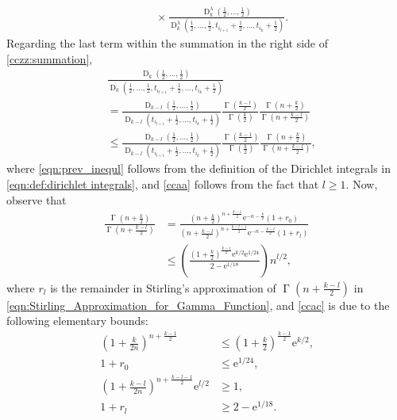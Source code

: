 \documentclass[journal, 10pt]{IEEEtran}
\newcommand{\rme}{\mathrm{e}}
\theoremstyle{plain}
\theoremstyle{plain}
\theoremstyle{plain}
\theoremstyle{plain}
\newcommand{\opD}{\operatorname{D}}
\newcommand{\opGamma}{\operatorname{\Gamma}}
\begin{document}
\begin{appendices}
\begin{IEEEproof}
\begin{align}
&\qquad \times \frac{\opD^{\lambda}_k (\frac12, \ldots, \frac12)}{{\opD^{\lambda}_k (\frac12, \hdots, \frac12, t_{i_{l+1}}+\frac12, \ldots ,t_{i_k}+\frac12 ) } }  \text{.} \nonumber
\end{align}
Regarding the last term within the summation in the right side of \eqref{cczz:summation},
\begin{align}
&\frac{\opD_k(\frac12, \ldots, \frac12) }{{\opD_k(\frac12, \hdots, \frac12, t_{i_{l+1}}+\frac12, \ldots ,t_{i_k}+\frac12 ) } } \nonumber \\
&=
\frac{\opD_{k-l}(\frac12, \hdots, \frac12)}{\opD_{k-l}(t_{i_{l+1}}+\frac12, \hdots, t_{i_k}+\frac12)}\frac{ \opGamma(\frac{k-l}{2})}{ \opGamma(\frac{k}{2})} 
\frac{ \opGamma(n+\frac{k}{2})}{ \opGamma(n+\frac{k-l}{2})} \label{eqn:prev_inequl}\\
&\le
\frac{\opD_{k-l}(\frac12, \hdots, \frac12)}{\opD_{k-l}(t_{i_{l+1}}+\frac12, \hdots, t_{i_k}+\frac12)}\frac{\opGamma(\frac{k-1}{2})}{\opGamma(\frac{k}{2})} 
\frac{\opGamma(n+\frac{k}{2})}{\opGamma(n+\frac{k-l}{2})}\text{,} \label{ccaa} 
\end{align}
where \eqref{eqn:prev_inequl} follows from the definition of the Dirichlet integrals in \eqref{eqn:def:dirichlet integrals}, and \eqref{ccaa} follows from the fact that $l\ge 1$. Now, observe that
\begin{align}
\frac{ \opGamma\left(n+\frac{k}{2}\right)}{\opGamma\left(n+\frac{k-l}{2}\right)} 
&=
\frac{\left(n+\frac{k}{2}\right)^{n+\frac{k-1}{2}}\rme^{-n-\frac{k}{2}}(1+r_0)}{\left(n+\frac{k-l}{2}\right)^{n+\frac{k-l-1}{2}}\rme^{-n-\frac{k-l}{2}}(1+r_l)} \label{ccab:stirling} \\
&\le 
\left(\frac{ \left(1+\frac{k}{2}\right)^{\frac{k-1}{2}} \rme^{k/2}\rme^{1/24}}
{ 2-\rme^{1/18}}
\right) n^{l/2}\text{,} \label{ccac}
\end{align} 
where $r_l$ is the remainder in Stirling's approximation of $\opGamma \left(n+\frac{k-l}{2} \right) $ in \eqref{eqn:Stirling_Approximation_for_Gamma_Function}, and \eqref{ccac} is due to the following elementary bounds:
\begin{align}
\left(1+\frac{k}{2n}\right)^{n+\frac{k-1}{2}} &\le  \left(1+\frac{k}{2}\right)^{\frac{k-1}{2}}\rme^{k/2}\text{,} \\
1+r_0 & \le \rme^{1/24}\text{,} \\
\left(1+\frac{k-l}{2n}\right)^{n+\frac{k-l-1}{2}} \rme^{l/2}&\ge  1\text{,} \\
1+r_l 
&\ge  2-\rme^{1/18}\text{.}
\end{align}

\end{IEEEproof}
\end{appendices}
\end{document}

